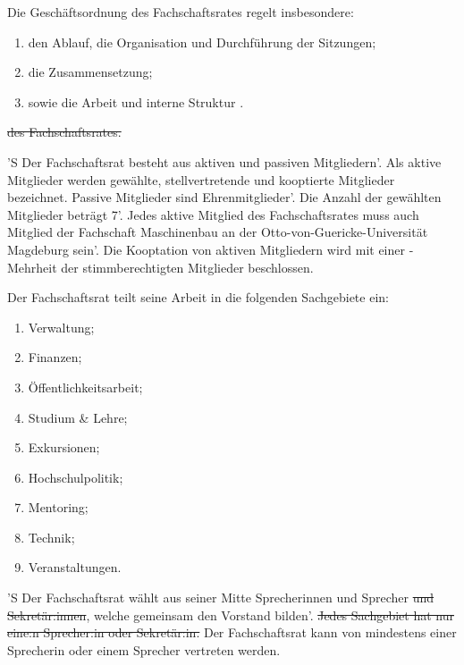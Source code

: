 \documentclass[%
	parskip=half,
]{scrartcl}
\newcommand{\edit}[1]{{\color{red} #1}}
\newcommand{\add}[1]{{\color{blue} #1}}
\newcommand{\new}[1]{{\color{orange} #1}}
\newcommand{\delete}[1]{{\color{red} \sout{#1}}}
\begin{document}
\begin{contract}


Die Geschäftsordnung \add{des Fachschaftsrates} regelt insbesondere:
\begin{enumerate}[\qquad a)]
	\item den Ablauf, die Organisation und Durchführung der Sitzungen;
	\item die Zusammensetzung;
	\item \add{sowie die} Arbeit und interne Struktur\edit{.}
\end{enumerate}
\delete{des Fachschaftsrates.}


'S Der Fachschaftsrat besteht aus \new{aktiven und passiven Mitgliedern'. Als aktive Mitglieder werden} gewählte,
stellvertretende und kooptierte Mitglieder \new{bezeichnet. Passive Mitglieder sind Ehrenmitglieder}'. Die Anzahl der
gewählten Mitglieder beträgt \edit{7}'. Jedes \new{aktive} Mitglied des Fachschaftsrates muss auch Mitglied der
Fachschaft \add{Maschinenbau an der Otto-von-Guericke-Universität Magdeburg} sein'. Die Kooptation von \new{aktiven}
Mitgliedern wird mit einer -Mehrheit der stimmberechtigten Mitglieder beschlossen.

Der Fachschaftsrat teilt seine Arbeit in die folgenden Sachgebiete ein:
\begin{enumerate}[\qquad a)]
	\item Verwaltung;
	\item Finanzen;
	\item Öffentlichkeitsarbeit;
	\item Studium \& Lehre;
	\item Exkursionen;
	\item Hochschulpolitik;
	\item Mentoring;
	\item Technik;
	\item Veranstaltungen.
\end{enumerate}

\Clause{title={\edit{Vorstand}}}

'S Der Fachschaftsrat wählt aus seiner Mitte \edit{Sprecherinnen und Sprecher} \delete{und Sekretär:innen}, welche
\edit{gemeinsam den Vorstand bilden}'. \delete{Jedes Sachgebiet hat nur eine:n Sprecher:in oder Sekretär:in.}\add{Der
Fachschaftsrat kann von mindestens einer Sprecherin oder einem Sprecher vertreten werden.}


\end{contract}
\end{document}
